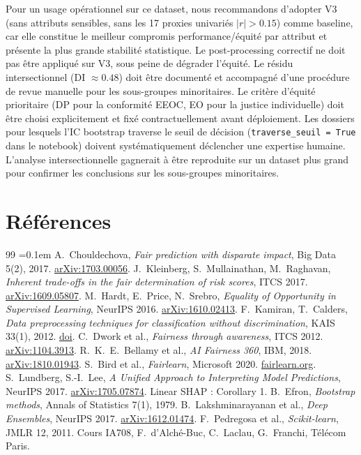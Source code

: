 \documentclass[11pt, a4paper]{article}
\begin{document}
Pour un usage opérationnel sur ce dataset, nous recommandons d'adopter V3 (sans attributs sensibles, sans les 17 proxies univariés $|r| > 0.15$) comme baseline, car elle constitue le meilleur compromis performance/équité par attribut et présente la plus grande stabilité statistique. Le post-processing correctif ne doit pas être appliqué sur V3, sous peine de dégrader l'équité. Le résidu intersectionnel (DI $\approx 0.48$) doit être documenté et accompagné d'une procédure de revue manuelle pour les sous-groupes minoritaires. Le critère d'équité prioritaire (DP pour la conformité EEOC, EO pour la justice individuelle) doit être choisi explicitement et fixé contractuellement avant déploiement. Les dossiers pour lesquels l'IC bootstrap traverse le seuil de décision (\texttt{traverse\_seuil = True} dans le notebook) doivent systématiquement déclencher une expertise humaine. L'analyse intersectionnelle gagnerait à être reproduite sur un dataset plus grand pour confirmer les conclusions sur les sous-groupes minoritaires.

\section*{Références}

{\footnotesize
\begin{thebibliography}{99}
\itemsep=0.1em
 A.~Chouldechova, \textit{Fair prediction with disparate impact}, Big Data 5(2), 2017. \href{https://arxiv.org/abs/1703.00056}{arXiv:1703.00056}.
 J.~Kleinberg, S.~Mullainathan, M.~Raghavan, \textit{Inherent trade-offs in the fair determination of risk scores}, ITCS 2017. \href{https://arxiv.org/abs/1609.05807}{arXiv:1609.05807}.
 M.~Hardt, E.~Price, N.~Srebro, \textit{Equality of Opportunity in Supervised Learning}, NeurIPS 2016. \href{https://arxiv.org/abs/1610.02413}{arXiv:1610.02413}.
 F.~Kamiran, T.~Calders, \textit{Data preprocessing techniques for classification without discrimination}, KAIS 33(1), 2012. \href{https://doi.org/10.1007/s10115-011-0463-8}{doi}.
 C.~Dwork et al., \textit{Fairness through awareness}, ITCS 2012. \href{https://arxiv.org/abs/1104.3913}{arXiv:1104.3913}.
 R.~K.~E.~Bellamy et al., \textit{AI Fairness 360}, IBM, 2018. \href{https://arxiv.org/abs/1810.01943}{arXiv:1810.01943}.
 S.~Bird et al., \textit{Fairlearn}, Microsoft 2020. \href{https://fairlearn.org/}{fairlearn.org}.
 S.~Lundberg, S.-I.~Lee, \textit{A Unified Approach to Interpreting Model Predictions}, NeurIPS 2017. \href{https://arxiv.org/abs/1705.07874}{arXiv:1705.07874}. Linear SHAP : Corollary 1.
 B.~Efron, \textit{Bootstrap methods}, Annals of Statistics 7(1), 1979.
 B.~Lakshminarayanan et al., \textit{Deep Ensembles}, NeurIPS 2017. \href{https://arxiv.org/abs/1612.01474}{arXiv:1612.01474}.
 F.~Pedregosa et al., \textit{Scikit-learn}, JMLR 12, 2011.
 Cours IA708, F.~d'Alché-Buc, C.~Laclau, G.~Franchi, Télécom Paris.
\end{thebibliography}
}
\end{document}
